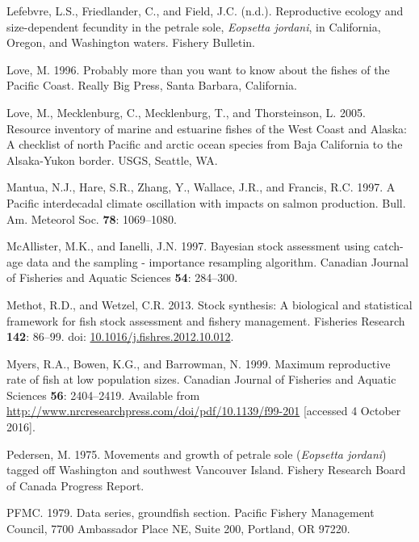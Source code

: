 \documentclass[12pt,]{article}
\begin{document}
\hypertarget{ref-lefebvre_reproductive_nodate}{}
Lefebvre, L.S., Friedlander, C., and Field, J.C. (n.d.). Reproductive
ecology and size-dependent fecundity in the petrale sole, \emph{Eopsetta
jordani}, in California, Oregon, and Washington waters. Fishery
Bulletin.

\hypertarget{ref-love_milton_probably_1996}{}
Love, M. 1996. Probably more than you want to know about the fishes of
the Pacific Coast. Really Big Press, Santa Barbara, California.

\hypertarget{ref-love_milton_resource_2005}{}
Love, M., Mecklenburg, C., Mecklenburg, T., and Thorsteinson, L. 2005.
Resource inventory of marine and estuarine fishes of the West Coast and
Alaska: A checklist of north Pacific and arctic ocean species from Baja
California to the Alsaka-Yukon border. USGS, Seattle, WA.

\hypertarget{ref-mantua_pacific_1997}{}
Mantua, N.J., Hare, S.R., Zhang, Y., Wallace, J.R., and Francis, R.C.
1997. A Pacific interdecadal climate oscillation with impacts on salmon
production. Bull. Am. Meteorol Soc. \textbf{78}: 1069--1080.

\hypertarget{ref-mcallister_bayesian_1997}{}
McAllister, M.K., and Ianelli, J.N. 1997. Bayesian stock assessment
using catch-age data and the sampling - importance resampling algorithm.
Canadian Journal of Fisheries and Aquatic Sciences \textbf{54}:
284--300.

\hypertarget{ref-methot_stock_2013}{}
Methot, R.D., and Wetzel, C.R. 2013. Stock synthesis: A biological and
statistical framework for fish stock assessment and fishery management.
Fisheries Research \textbf{142}: 86--99. doi:
\href{https://doi.org/10.1016/j.fishres.2012.10.012}{10.1016/j.fishres.2012.10.012}.

\hypertarget{ref-myers_maximum_1999}{}
Myers, R.A., Bowen, K.G., and Barrowman, N. 1999. Maximum reproductive
rate of fish at low population sizes. Canadian Journal of Fisheries and
Aquatic Sciences \textbf{56}: 2404--2419. Available from
\url{http://www.nrcresearchpress.com/doi/pdf/10.1139/f99-201}
{[}accessed 4 October 2016{]}.

\hypertarget{ref-pedersen_movements_1975}{}
Pedersen, M. 1975. Movements and growth of petrale sole (\emph{Eopsetta
jordani}) tagged off Washington and southwest Vancouver Island. Fishery
Research Board of Canada Progress Report.

\hypertarget{ref-pfmc_data_1979}{}
PFMC. 1979. Data series, groundfish section. Pacific Fishery Management
Council, 7700 Ambassador Place NE, Suite 200, Portland, OR 97220.
\end{document}
